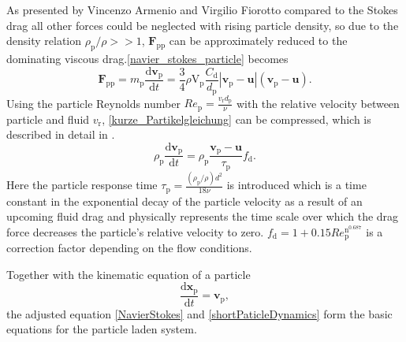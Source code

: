 \documentclass[11pt,a4paper,openany,oneside,parskip=half*]{article}
\renewcommand*\vec[1]{\boldsymbol{#1}}
\begin{document}
As presented by Vincenzo Armenio and Virgilio Fiorotto \cite{TheImportanceOfTheForcesActingOnParticlesInTurbulentFlows} compared to the Stokes drag all other forces could be neglected with rising particle density, so due to the density relation $\rho_\mathrm{p}/\rho >> 1$, $\vec{F}_\mathrm{pp}$ can be approximately reduced to the dominating viscous drag.\eqref{navier_stokes_particle} becomes 
\begin{equation} \label{kurze_Partikelgleichung}
\vec{F}_\mathrm{pp} =  m_\mathrm{p} \frac{\mathrm{d}\vec{v}_\mathrm{p}}{\mathrm{d}t} = \frac{3}{4}\rho \mathrm{V}_\mathrm{p} \frac{C_\mathrm{d}}{d_\mathrm{p}}|\vec{v}_\mathrm{p}-\vec{u}|(\vec{v}_\mathrm{p}-\vec{u}).
\end{equation} 
Using the particle Reynolds number $Re_\mathrm{p} = \frac{v_\mathrm{r}d_\mathrm{p}}{\nu}$ with the relative velocity between particle and fluid $v_\mathrm{r}$,  \eqref{kurze_Partikelgleichung} can be compressed, which is described in detail in \cite{computationalMethodsforMultiphaseFlow}.
\begin{equation} \label{shortPaticleDynamics}
\rho_\mathrm{p}\frac{\mathrm{d}\vec{v}_\mathrm{p}}{\mathrm{d}t} = \rho_\mathrm{p}\frac{\vec{v}_\mathrm{p}-\vec{u}}{\tau_\mathrm{p}}f_\mathrm{d}.
\end{equation}
Here the particle response time $\tau_\mathrm{p} = \frac{(\rho_\mathrm{p}/\rho)d^\mathrm{2}}{18\nu}$ is introduced which is a time constant in the exponential decay of the particle velocity as a result of an upcoming fluid drag and physically represents the time scale over which the drag force decreases the particle's relative velocity to zero.
$f_\mathrm{d} = 1+0.15Re_\mathrm{p}^\mathrm{n^{0.687}}$ is a correction factor depending on the flow conditions.


Together with the kinematic equation of a particle   
\begin{equation}
 \frac{\mathrm{d}\vec{x}_\mathrm{p}}{\mathrm{d}t} = \vec{v}_\mathrm{p},
\end{equation}
the adjusted equation \eqref{NavierStokes} and \eqref{shortPaticleDynamics} form the basic equations for the particle laden system. 





\end{document}
